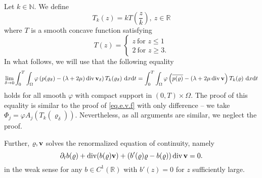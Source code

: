 \documentclass{article}
\DeclareMathOperator{\diver}{div}
\newcommand{\bv}{{\bf v}}
\newcommand{\vv}{\bv}
\newcommand{\pat}{\partial_t}
\numberwithin{equation}{section}
\begin{document}
Let $k\in \mathbb N$. We define
$$
T_k(z) = k T\left(\frac zk\right), \ z\in \mathbb R
$$
where $T$ is a smooth concave function satisfying
$$
T(z) = \left\{
\begin{array}{l}
z\ \mbox{for }z\leq 1\\
2\ \mbox{for }z\geq 3.
\end{array}
\right.
$$
In what follows, we will use that the following equality
\begin{equation}\label{effective.flux}
\lim_{\delta \to 0} \int_0^T\int_\Omega \varphi \left(p(\varrho_\delta) - (\lambda + 2\mu)\diver \vv_\delta\right)T_k(\varrho_\delta)\ {\rm d}x{\rm d}t 
= \int_0^T\int_\Omega \varphi \left(\overline{p(\varrho)} - (\lambda +2\mu\diver \vv \right) T_k (\varrho)\ {\rm d}x{\rm d}t
\end{equation}
holds for all smooth $\varphi$ with compact support in $(0,T)\times \Omega$. The proof of this equality is similar to the proof of \eqref{eq.e.v.f} with  only difference -- we take $\Phi_j = \varphi A_j(T_k(\varrho_\delta))$. Nevertheless, as all arguments are similar, we neglect the proof. 

Further, $\varrho,\vv$ solves the renormalized equation of continuity, namely
\begin{equation}\label{renorm.con}
\pat b(\varrho) + \diver (b(\varrho)\vv) + (b'(\varrho)\varrho - b(\varrho))\diver\vv = 0.
\end{equation}
in the weak sense for any $b\in C^1(\mathbb R)$ with $b'(z)=0$ for $z$ sufficiently large.
\end{document}

